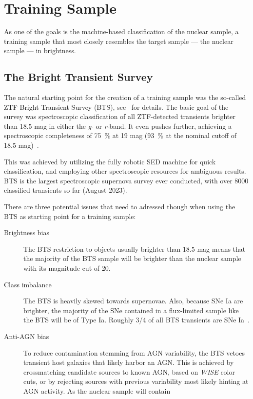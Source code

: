 \section{Training Sample}
As one of the goals is the machine-based classification of the nuclear sample, a training sample that most closely resembles the target sample --- the nuclear sample --- in brightness.

\subsection{The Bright Transient Survey}\label{bts}
The natural starting point for the creation of a training sample was the so-called ZTF Bright Transient Survey (BTS), see~\cite{Fremling2020,Perley2020} for details. The basic goal of the survey was spectroscopic classification of all ZTF-detected transients brighter than 18.5 mag in either the \textit{g}- or \textit{r}-band. It even pushes further, achieving a spectroscopic completeness of \SI{75}{\percent} at 19 mag (\SI{93}{\percent} at the nominal cutoff of 18.5 mag)~\cite{Perley2020}.

This was achieved by utilizing the fully robotic SED machine for quick classification, and employing other spectroscopic resources for ambiguous results. BTS is the largest spectroscopic supernova survey ever conducted, with over 8000 classified transients so far (August 2023).

There are three potential issues that need to adressed though when using the BTS as starting point for a training sample:

\begin{description}
    \item[Brightness bias] The BTS restriction to objects usually brighter than 18.5 mag means that the majority of the BTS sample will be brighter than the nuclear sample with its magnitude cut of 20.
    \item[Class imbalance] The BTS is heavily skewed towards supernovae. Also, because SNe Ia are brighter, the majority of the SNe contained in a flux-limited sample like the BTS will be of Type Ia. Roughly 3/4 of all BTS transients are SNe Ia~\cite{Perley2020}.
    \item[Anti-AGN bias] To reduce contamination stemming from AGN variability, the BTS vetoes transient host galaxies that likely harbor an AGN. This is achieved by crossmatching candidate sources to known AGN, based on \textit{WISE} color cuts, or by rejecting sources with previous variability most likely hinting at AGN activity. As the nuclear sample will contain
\end{description}

